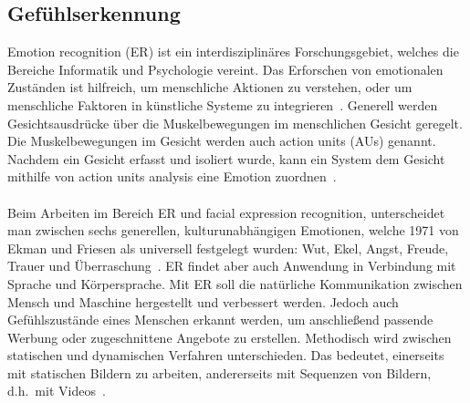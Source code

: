\subsection{Gefühlserkennung}
Emotion recognition (ER) ist ein interdisziplinäres Forschungsgebiet, welches die Bereiche Informatik und Psychologie vereint. Das Erforschen von emotionalen Zuständen ist hilfreich, um menschliche Aktionen zu verstehen, oder um menschliche Faktoren in künstliche Systeme zu integrieren~\cite{eyetrackemotionrec}.
Generell werden Gesichtsausdrücke über die Muskelbewegungen im menschlichen Gesicht geregelt. Die Muskelbewegungen im Gesicht werden auch action units (AUs) genannt. Nachdem ein Gesicht erfasst und isoliert wurde, kann ein System dem Gesicht mithilfe von action units analysis eine Emotion zuordnen~\cite{wildemotionrec}.
\\
\\
Beim Arbeiten im Bereich ER und facial expression recognition, unterscheidet man zwischen sechs generellen, kulturunabhängigen Emotionen, welche 1971 von Ekman und Friesen als universell festgelegt wurden: Wut, Ekel, Angst, Freude, Trauer und Überraschung~\cite{cnnemotionrec}. ER findet aber auch Anwendung in Verbindung mit Sprache und Körpersprache. Mit ER soll die natürliche Kommunikation zwischen Mensch und Maschine hergestellt und verbessert werden. Jedoch auch Gefühlszustände eines Menschen erkannt werden, um anschließend passende Werbung oder zugeschnittene Angebote zu erstellen. Methodisch wird zwischen statischen und dynamischen Verfahren unterschie\-den. Das bedeutet, einerseits mit statischen Bildern zu arbeiten, andererseits mit Sequenzen von Bildern, d.h.~mit Videos~\cite{facialemotionrecusingcnn}.
\\
